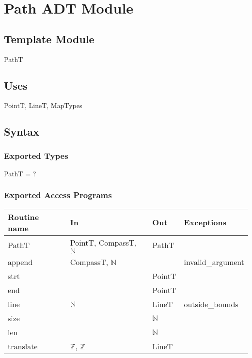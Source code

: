 \documentclass[12pt]{article}
\begin{document}
\newpage

\section* {Path ADT Module}

\subsection*{Template Module}

PathT

\subsection* {Uses}

PointT, LineT, MapTypes

\subsection* {Syntax}

\subsubsection* {Exported Types}

PathT = ?

\subsubsection* {Exported Access Programs}

\begin{tabular}{| l | l | l | l |}
\hline
\textbf{Routine name} & \textbf{In} & \textbf{Out} & \textbf{Exceptions}\\
\hline
PathT & PointT, CompassT, $\mathbb{N}$ & PathT & \\ %
\hline
append & CompassT, $\mathbb{N}$ & & invalid\_argument\\ 
\hline
strt & ~ & PointT & ~\\
\hline
end & ~ & PointT & ~\\
\hline
line & $\mathbb{N}$ & LineT & outside\_bounds\\
\hline
size & ~ & $\mathbb{N}$ & \\
\hline
 len & ~ & $\mathbb{N}$ & ~\\
\hline
translate & $\mathbb{Z}$, $\mathbb{Z}$ & LineT  & ~\\
\hline
\end{tabular}
\end{document}

